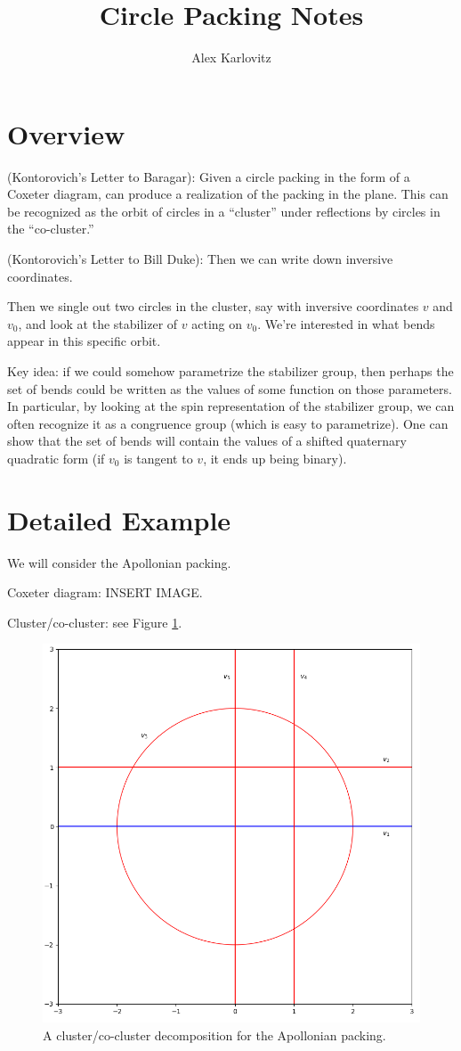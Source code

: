 \documentclass[]{article}
\title{Circle Packing Notes}
\author{Alex Karlovitz}
\date{}
\begin{document}
	
	\maketitle
	
\section*{Overview}

(Kontorovich's Letter to Baragar): Given a circle packing in the form of a Coxeter diagram, can produce a realization of the packing in the plane. This can be recognized as the orbit of circles in a ``cluster'' under reflections by circles in the ``co-cluster.''

(Kontorovich's Letter to Bill Duke): Then we can write down inversive coordinates.

Then we single out two circles in the cluster, say with inversive coordinates $v$ and  $v_0$, and look at the stabilizer of $v$ acting on $v_0$.
We're interested in what bends appear in this specific orbit.

Key idea: if we could somehow parametrize the stabilizer group, then perhaps the set of bends could be written as the values of some function on those parameters.
In particular, by looking at the spin representation of the stabilizer group, we can often recognize it as a congruence group (which is easy to parametrize).
One can show that the set of bends will contain the values of a shifted quaternary quadratic form (if $v_0$ is tangent to $v$, it ends up being binary).

\section*{Detailed Example}

We will consider the Apollonian packing.

Coxeter diagram: INSERT IMAGE.

Cluster/co-cluster: see Figure \ref{c-coc_Ap}.

\begin{figure}[h]
	\centering
	\includegraphics[width=0.6\linewidth]{c-coc_Ap.png}
	\caption{A cluster/co-cluster decomposition for the Apollonian packing.}
	\label{c-coc_Ap}
\end{figure}
\end{document}
